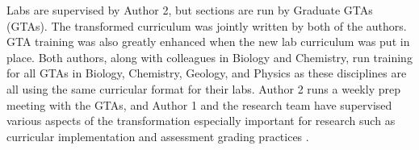 \documentclass[aip, numerical, preprint]{revtex4-2}
\begin{document}

Labs are supervised by Author 2, but sections are run by Graduate GTAs (GTAs). The
transformed curriculum was jointly written by both of the authors.  GTA training was also greatly
enhanced when the new lab curriculum was put in place.  Both authors, along with colleagues in
Biology and Chemistry, run training for all GTAs in Biology, Chemistry, Geology, and Physics
as these disciplines are all using the same curricular format for their labs.  Author 2 runs a
weekly prep meeting with the GTAs, and Author 1 and the research team have supervised various
aspects of the transformation especially important for research such as curricular
implementation \citep{SmithJoyner2020} and assessment grading practices \citep{Wolf2019mask}.
\end{document}
